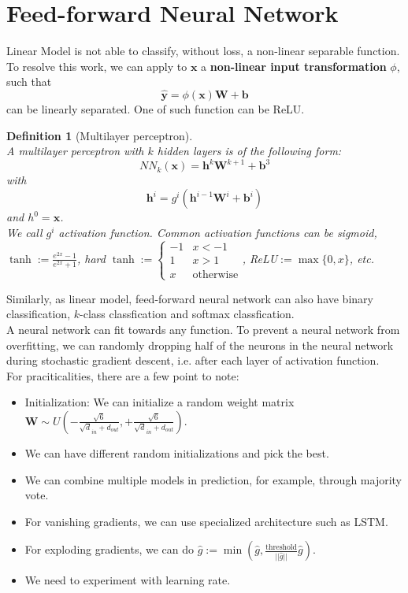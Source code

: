 \documentclass[12pt]{article}
\newtheorem{definition}{Definition}[section]
\theoremstyle{definition}
\newcommand{\x}{\mathbf{x}}
\newcommand{\y}{\mathbf{y}}
\begin{document}
\section{Feed-forward Neural Network}
Linear Model is not able to classify, without loss, a non-linear separable function. To resolve this work, we can apply to $\x$ a \textbf{non-linear input transformation} $\phi$, such that
\[
\hat{\y} = \phi(\x)\mathbf{W}+\mathbf{b}
\]
can be linearly separated. One of such function can be ReLU.
\begin{definition}[Multilayer perceptron]
\hfill\\\normalfont A multilayer perceptron with $k$ hidden layers is of the following form:
\[
NN_{k}(\x)=\mathbf{h}^{k}\mathbf{W}^{k+1}+\mathbf{b}^3 
\]
with 
\[
\mathbf{h}^i = g^i(\mathbf{h}^{i-1}\mathbf{W}^i + \mathbf{b}^i)
\]
and $h^0 = \x$.\\
We call $g^i$ activation function. Common activation functions can be sigmoid, $\tanh:=\frac{e^{2x}-1}{e^{2x}+1}$, hard $\tanh:=\begin{cases} -1 & x< -1 \\ 1 & x> 1 \\ x & \text{otherwise}\end{cases}$, ReLU$:=\max\{0,x\}$, etc.
\end{definition}
Similarly, as linear model, feed-forward neural network can also have binary classification, $k$-class classfication and softmax classfication.\\

A neural network can fit towards any function. To prevent a neural network from overfitting, we can randomly dropping half of the neurons in the neural network during stochastic gradient descent, i.e. after each layer of activation function.\\

For praciticalities, there are a few point to note:
\begin{itemize}
	\item Initialization: We can initialize a random weight matrix $\mathbf{W}\sim U(-\frac{\sqrt{6}}{\sqrt d_{in}+d_{out}}, +\frac{\sqrt{6}}{\sqrt d_{in}+d_{out}})$.
	\item We can have different random initializations and pick the best.
	\item We can combine multiple models in prediction, for example, through majority vote.
	\item For vanishing gradients, we can use specialized architecture such as LSTM.
	\item For exploding gradients, we can do $\hat{g}:=\min(\hat{g}, \frac{\text{threshold}}{||\hat{g}||}\hat{g})$.
	\item We need to experiment with learning rate.
\end{itemize}
\clearpage
\end{document}
